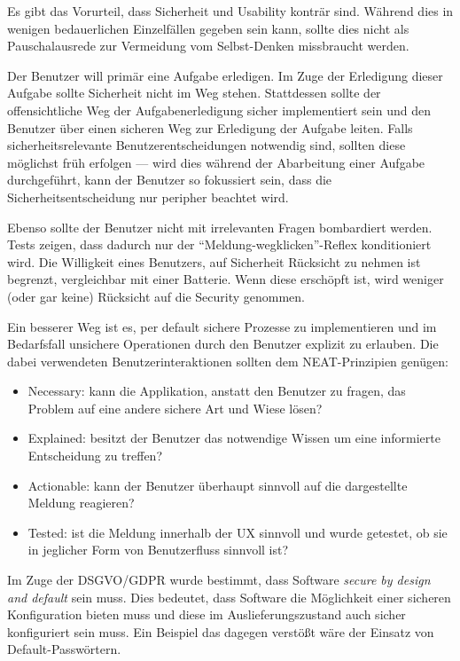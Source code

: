 Es gibt das Vorurteil, dass Sicherheit und Usability konträr sind. Während dies in wenigen bedauerlichen Einzelfällen gegeben sein kann, sollte dies nicht als Pauschalausrede zur Vermeidung vom Selbst-Denken missbraucht werden.

Der Benutzer will primär eine Aufgabe erledigen. Im Zuge der Erledigung dieser Aufgabe sollte Sicherheit nicht im Weg stehen. Stattdessen sollte der offensichtliche Weg der Aufgabenerledigung sicher implementiert sein und den Benutzer über einen sicheren Weg zur Erledigung der Aufgabe leiten. Falls sicherheitsrelevante Benutzerentscheidungen notwendig sind, sollten diese möglichst früh erfolgen --- wird dies während der Abarbeitung einer Aufgabe durchgeführt, kann der Benutzer so fokussiert sein, dass die Sicherheitsentscheidung nur peripher beachtet wird.

Ebenso sollte der Benutzer nicht mit irrelevanten Fragen bombardiert werden. Tests zeigen, dass dadurch nur der ``Meldung-wegklicken''-Reflex konditioniert wird. Die Willigkeit eines Benutzers, auf Sicherheit Rücksicht zu nehmen ist begrenzt, vergleichbar mit einer Batterie. Wenn diese erschöpft ist, wird weniger (oder gar keine) Rücksicht auf die Security genommen.

Ein besserer Weg ist es, per default sichere Prozesse zu implementieren und im Bedarfsfall unsichere Operationen durch den Benutzer explizit zu erlauben. Die dabei verwendeten Benutzerinteraktionen sollten dem NEAT-Prinzipien genügen:

\begin{itemize}
	\item Necessary: kann die Applikation, anstatt den Benutzer zu fragen, das Problem auf eine andere sichere Art und Wiese lösen?
	\item Explained: besitzt der Benutzer das notwendige Wissen um eine informierte Entscheidung zu treffen?
	\item Actionable: kann der Benutzer überhaupt sinnvoll auf die dargestellte Meldung reagieren?
	\item Tested: ist die Meldung innerhalb der UX sinnvoll und wurde getestet, ob sie in jeglicher Form von Benutzerfluss sinnvoll ist?
\end{itemize}

Im Zuge der DSGVO/GDPR wurde bestimmt, dass Software \textit{secure by design and default} sein muss. Dies bedeutet, dass Software die Möglichkeit einer sicheren Konfiguration bieten muss und diese im Auslieferungszustand auch sicher konfiguriert sein muss. Ein Beispiel das dagegen verstößt wäre der Einsatz von Default-Passwörtern.

